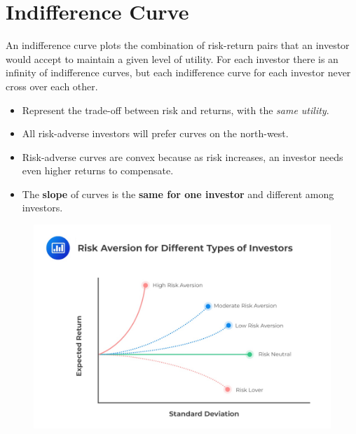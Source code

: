 \documentclass[11pt,a4paper]{report}
\begin{document}
\section{Indifference Curve}
An indifference curve plots the combination of risk-return pairs that an investor would accept to maintain a given level of utility. For each investor there is an infinity of indifference curves, but each indifference curve for each investor never cross over each other.
\begin{itemize}
    \item Represent the trade-off between risk and returns, with the \textit{same utility}.
    \item All risk-adverse investors will prefer curves on the north-west.
    \item Risk-adverse curves are convex because as risk increases, an investor needs even higher returns to compensate.
    \item The \textbf{slope} of curves is the \textbf{same for one investor} and different among investors.
\end{itemize}
\begin{figure}[h]
    \centering
    \includegraphics[width=\textwidth]{images/Risk-Aversion-for-Different-Types-of-Investors.png}
\end{figure}
\end{document}
